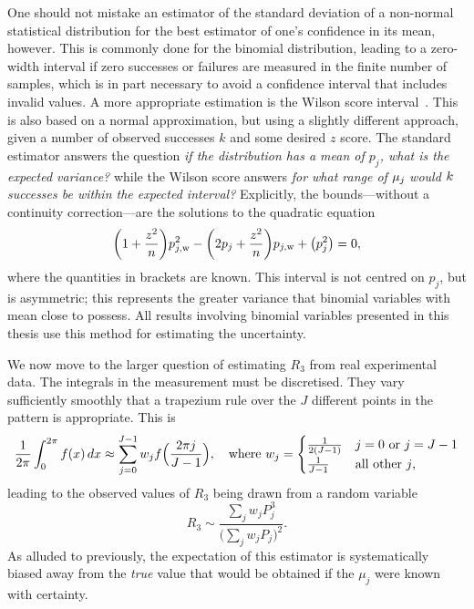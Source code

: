 One should not mistake an estimator of the standard deviation of a non-normal statistical distribution for the best estimator of one's confidence in its mean, however.
This is commonly done for the binomial distribution, leading to a zero-width interval if zero successes or failures are measured in the finite number of samples, which is in part necessary to avoid a confidence interval that includes invalid values.
A more appropriate estimation is the Wilson score interval~\cite{Wilson1927}.
This is also based on a normal approximation, but using a slightly different approach, given a number of observed successes $k$ and some desired $z$ score.
The standard estimator answers the question \emph{if the distribution has a mean of $p_j$, what is the expected variance?} while the Wilson score answers \emph{for what range of $\mu_j\mkern-2mu$ would $k\mkern-2mu$ successes be within the expected interval?}
Explicitly, the bounds---without a continuity correction---are the solutions to the quadratic equation
\begin{equation}
\biggl(1 + \frac{z^2}{n}\biggr) p_{j,\text w}^2 - \biggl(2p_j + \frac{z^2}{n}\biggr) p_{j,\text w} + \bigl(p_j^2\bigr) = 0,
\end{equation}
where the quantities in brackets are known.
This interval is not centred on $p_j$, but is asymmetric; this represents the greater variance that binomial variables with mean close to  possess.
All results involving binomial variables presented in this thesis use this method for estimating the uncertainty.

We now move to the larger question of estimating $R_3$ from real experimental data.
The integrals in the measurement must be discretised.
They vary sufficiently smoothly that a trapezium rule over the $J$ different points in the pattern is appropriate.
This is
\begin{equation}
\frac1{2\pi}\int_0^{2\pi} f(x)\,dx \approx \sum_{j=0}^{J-1} w_j f\Bigl(\frac{2\pi j}{J-1}\Bigr),
\quad\text{where\ }
w_j = \begin{cases}\frac1{2(J-1)}&\text{$j=0$ or $j=J-1$}\\\frac1{J-1}&\text{all other $j$,}\end{cases}
\end{equation}
leading to the observed values of $R_3$ being drawn from a random variable
\begin{equation}
R_3 \sim \frac{\sum_j w_j P_j^3}{\bigl(\sum_j w_j P_j\bigr)^2}.
\end{equation}
As alluded to previously, the expectation of this estimator is systematically biased away from the \emph{true} value that would be obtained if the $\mu_j$ were known with certainty.

